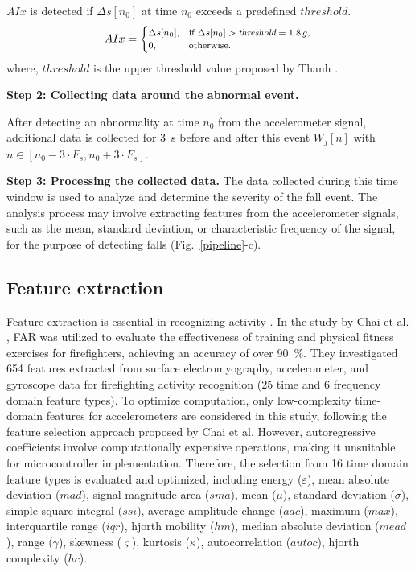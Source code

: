 \documentclass[journal,twoside,web]{ieeecolor}
\begin{document}
$AIx$ is detected if $\Delta s[n_0]$ at time $n_0$  exceeds a predefined $threshold$.
\begin{equation}\footnotesize
AIx =
\begin{cases} 
\Delta s[n_0], & \text{if } \Delta s[n_0] > \textit{threshold}=1.8\,g, \\
0, & \text{otherwise}.
\end{cases}\\
\end{equation}
where, $threshold$ is the upper threshold value proposed by Thanh \cite{Thanhfire2019}.

\textbf{Step 2: Collecting data around the abnormal event.} 

After detecting an abnormality at time \( n_0 \) from the accelerometer signal, additional data is collected for 3~s before and after this event $W_j[n]$ with $n \in [n_0-3\cdot F_s,n_0+3\cdot F_s]$.


\textbf{Step 3: Processing the collected data.} 
The data collected during this time window is used to analyze and determine the severity of the fall event. The analysis process may involve extracting features from the accelerometer signals, such as the mean, standard deviation, or characteristic frequency of the signal, for the purpose of detecting falls (Fig.~\ref{pipeline}-c).


\subsection{Feature extraction}

Feature extraction is essential in recognizing activity \cite{ViManhTuyen2024,HongNhung2023,ImportandFeature2023}. In the study by Chai et al. \cite{CHAI_FIRE2024}, FAR was utilized to evaluate the effectiveness of training and physical fitness exercises for firefighters, achieving an accuracy of over 90~\%. They investigated 654 features extracted from surface electromyography, accelerometer, and gyroscope data for firefighting activity recognition (25 time and 6 frequency domain feature types). To optimize computation, only low-complexity time-domain features for accelerometers are considered in this study, following the feature selection approach proposed by Chai et al. However, autoregressive coefficients involve computationally expensive operations, making it unsuitable for microcontroller implementation. Therefore, the selection from 16 time domain feature types is evaluated and optimized, including energy ($\varepsilon$), mean absolute deviation ($mad$), signal magnitude area ($sma$), mean ($\mu$), standard deviation ($\sigma$), simple square integral ($ssi$), average amplitude change ($aac$), maximum ($max$), interquartile range ($iqr$), hjorth mobility ($hm$), median absolute deviation ($mead$), range ($\gamma$), skewness ($\varsigma$), kurtosis ($\kappa$), autocorrelation ($autoc$), hjorth complexity ($hc$).
\end{document}
